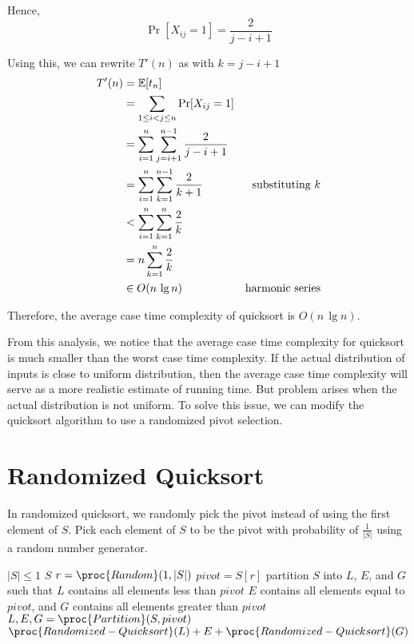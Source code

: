 \begin{enumerate}
    Hence,
    $$
    \Pr[X_{ij} = 1] = \frac{2}{j-i+1}
    $$

    Using this, we can rewrite $T'(n)$ as with $k = j-i+1$ 
    $$
    \begin{aligned}
        T'(n) &= \operatorname*{\mathbb{E}}[t_n] \\
        &= \sum_{1 \leq i < j \leq n} \Pr[X_{ij} = 1] \\
        &= \sum_{i=1}^n \sum_{j=i+1}^{n-1} \frac{2}{j-i+1} \\
        &= \sum_{i=1}^n \sum_{k=1}^{n-1} \frac{2}{k+1} & \text{substituting $k$} \\
        &< \sum_{i=1}^n \sum_{k=1}^n \frac{2}{k} \\
        &= n \sum_{k=1}^n \frac{2}{k} \\
        &\in O(n\, \lg n) & \text{harmonic series} \\
    \end{aligned}
    $$

    Therefore, the average case time complexity of quicksort is $O(n \, \lg n)$.
\end{enumerate}

From this analysis, we notice that the average case time complexity for quicksort is much smaller than the worst case time complexity. If the actual distribution of inputs is close to uniform distribution, then the average case time complexity will serve as a more realistic estimate of running time. But problem arises when the actual distribution is not uniform. To solve this issue, we can modify the quicksort algorithm to use a randomized pivot selection.

\section{Randomized Quicksort} 

In randomized quicksort, we randomly pick the pivot instead of using the first element of $S$. Pick each element of $S$ to be the pivot with probability of $\displaystyle \frac{1}{|S|}$ using a random number generator. 

\begin{codebox}
    \li \If $|S| \leq 1$
    \li \Then \Return $S$ \End
    \li $r = \proc{Random}(1,|S|)$
    \li $pivot = S[r]$ 
    \zi \Comment partition $S$ into $L$, $E$, and $G$ such that $L$ contains all elements less than $pivot$
    \zi \Comment $E$ contains all elements equal to $pivot$, and $G$ contains all elements greater than $pivot$
    \li $L,E,G = \proc{Partition}(S,pivot)$
    \li \Return $\proc{Randomized-Quicksort}(L) + E + \proc{Randomized-Quicksort}(G)$
\end{codebox}


